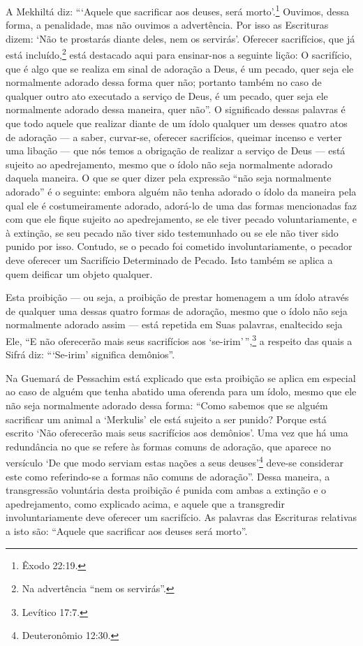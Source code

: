 A Mekhiltá diz: ```Aquele que sacrificar aos deuses, será morto'.\footnote{Êxodo
22:19.} Ouvimos, dessa forma, a penalidade, mas não ouvimos a
advertência. Por isso as Escrituras dizem: `Não te prostarás diante
deles, nem os servirás'.
Oferecer sacrifícios, que já está incluído,\footnote{Na advertência ``nem os servirás''.} está
destacado aqui para ensinar-nos a seguinte lição: O sacrifício, que é
algo que se realiza em sinal de adoração a Deus, é um pecado, quer seja
ele normalmente adorado dessa forma quer não; portanto também no caso de
qualquer outro ato executado a serviço de Deus, é um pecado, quer seja
ele normalmente adorado dessa maneira, quer não''. O significado dessas
palavras é que todo aquele que realizar diante de um ídolo qualquer um
desses quatro atos de adoração --- a saber, curvar-se, oferecer
sacrifícios, queimar incenso e verter uma libação --- que nós temos a
obrigação de realizar a serviço de Deus --- está sujeito ao
apedrejamento, mesmo que o ídolo não seja normalmente adorado daquela
maneira. O que se quer dizer pela expressão ``não seja normalmente
adorado'' é o seguinte: embora alguém não tenha adorado o ídolo da
maneira pela qual ele é costumeiramente adorado, adorá-lo de uma das
formas mencionadas faz com que ele fique sujeito ao apedrejamento, se
ele tiver pecado voluntariamente, e à extinção, se seu pecado não tiver
sido testemunhado ou se ele não tiver sido punido por isso. Contudo, se
o pecado foi cometido involuntariamente, o pecador deve oferecer um
Sacrifício Determinado de Pecado. Isto também se aplica a quem deificar
um objeto qualquer.

Esta proibição --- ou seja, a proibição de prestar homenagem a um ídolo
através de qualquer uma dessas quatro formas de adoração, mesmo que o
ídolo não seja normalmente adorado assim --- está repetida em Suas
palavras, enaltecido seja Ele, ``E não oferecerão mais seus sacrifícios
aos `se-irim'\,'',\footnote{Levítico 17:7.} a respeito das quais a Sifrá diz:
```Se-irim' significa demônios''.

Na Guemará de Pessachim está explicado que esta proibição se aplica em
especial ao caso de alguém que tenha abatido uma oferenda para um ídolo,
mesmo que ele não seja normalmente adorado dessa forma: ``Como sabemos
que se alguém sacrificar um animal a `Merkulis' ele está sujeito a ser
punido? Porque está escrito `Não oferecerão mais seus sacrifícios aos
demônios'. Uma vez que há uma redundância no que se refere às formas
comuns de adoração, que aparece no versículo `De que modo serviam estas
nações a seus deuses'\footnote{Deuteronômio 12:30.} deve-se considerar este como
referindo-se a formas não comuns de adoração''. Dessa maneira, a
transgressão voluntária desta proibição é punida com ambas a extinção e
o apedrejamento, como explicado acima, e aquele que a transgredir
involuntariamente deve oferecer um sacrifício. As palavras das
Escrituras relativas a isto são: ``Aquele que sacrificar aos deuses será
morto''.

